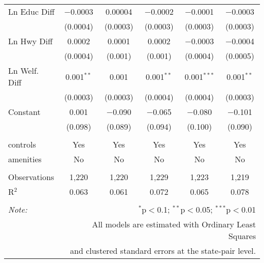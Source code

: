 \begin{table}[!htbp]
\begin{tabular}{@{\extracolsep{5pt}}lccccc}
  Ln Educ Diff & $-$0.0003 & 0.00004 & $-$0.0002 & $-$0.0001 & $-$0.0003 \\ 
  & (0.0004) & (0.0003) & (0.0003) & (0.0003) & (0.0003) \\ 
  Ln Hwy Diff & 0.0002 & 0.0001 & 0.0002 & $-$0.0003 & $-$0.0004 \\ 
  & (0.0004) & (0.001) & (0.001) & (0.0004) & (0.0005) \\ 
  Ln Welf. Diff & 0.001$^{**}$ & 0.001 & 0.001$^{**}$ & 0.001$^{***}$ & 0.001$^{**}$ \\ 
  & (0.0003) & (0.0003) & (0.0004) & (0.0004) & (0.0003) \\ 
  Constant & 0.001 & $-$0.090 & $-$0.065 & $-$0.080 & $-$0.101 \\ 
  & (0.098) & (0.089) & (0.094) & (0.100) & (0.090) \\ 
 \hline \\[-1.8ex] 
controls & Yes & Yes & Yes & Yes & Yes \\ 
amenities & No & No & No & No & No \\ 
\hline \\[-1.8ex] 
Observations & 1,220 & 1,220 & 1,229 & 1,223 & 1,219 \\ 
R$^{2}$ & 0.063 & 0.061 & 0.072 & 0.065 & 0.078 \\ 
\hline 
\hline \\[-1.8ex] 
\textit{Note:}  & \multicolumn{5}{r}{$^{*}$p$<$0.1; $^{**}$p$<$0.05; $^{***}$p$<$0.01} \\ 
 & \multicolumn{5}{r}{All models are estimated with Ordinary Least Squares} \\ 
 & \multicolumn{5}{r}{and clustered standard errors at the state-pair level.} \\ 
\end{tabular} 
\end{table} 
